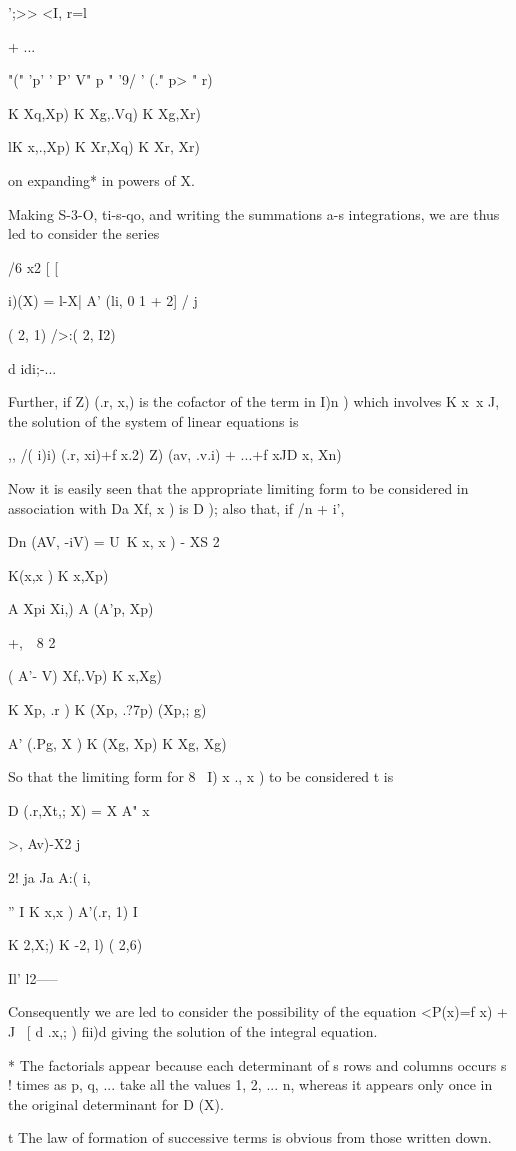 ';>> <I, r=l

+ ...

 "(" 'p' ' P' V" p " '9/ ' (." p> " r)

K Xq,Xp) K Xg,.Vq) K Xg,Xr)

lK x,.,Xp) K Xr,Xq) K Xr, Xr)

on expanding* in powers of X.

Making S-3-O, ti-s-qo, and writing the summations a-s integrations, we
are thus led to consider the series

/6 x2 [ [

i)(X) = l-X| A' (li, 0 1 + 2] / j

 ( 2, 1) />:( 2, I2)

d idi;-...

Further, if Z) (.r, x,) is the cofactor of the term in I)n ) which
involves K x\, x J, the solution of the system of linear equations is

,, /( i)i) (.r, xi)+f x.2) Z) (av, .v.i) + ...+f xJD x, Xn)

Now it is easily seen that the appropriate limiting form to be
considered in association with Da Xf, x ) is D ); also that, if /n +
i',

Dn (AV, -iV) = U\ K x, x ) - XS 2

K(x,x ) K x,Xp)

A Xpi Xi,) A (A'p, Xp)

+,\ \ 8 2

 ( A'- V) Xf,.Vp) K x,Xg)

K Xp, .r ) K (Xp, .?7p) (Xp,; g)

A' (.Pg, X ) K (Xg, Xp) K Xg, Xg)

So that the limiting form for 8~ I) x ., x ) to be considered t is

D (.r,Xt,; X) = X A" x

>, Av)-X2 j

2! ja Ja A:( i,

'' I K x,x ) A'(.r, 1) I

K 2,X;) K -2, l) ( 2,6)

 Il' l2-----

Consequently we are led to consider the possibility of the equation
<P(x)=f x) + J \ [ d .x,; ) fii)d giving the solution of the integral
equation.

* The factorials appear because each determinant of s rows and columns
occurs s ! times as p, q, ... take all the values 1, 2, ... n, whereas
it appears only once in the original determinant for D (X).

t The law of formation of successive terms is obvious from those
written down.

